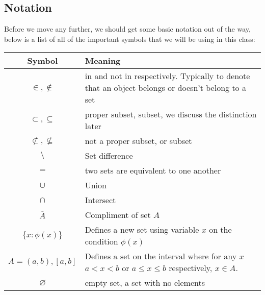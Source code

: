 \subsection{Notation}
Before we move any further, we should get some basic notation out of the way, below is a list of all of the important symbols that we will be using in this class:
\begin{center}
	\begin{longtable}{| c | m{6cm} |}
		\hline 
		Symbol & Meaning \\
		\hline 
		$\in,\notin$   & in and not in respectively. Typically to denote that an object belongs or doesn't belong to a set \\
		\hline 
		$\subset, \subseteq$ & proper subset, subset, we discuss the distinction later \\
		\hline
		$\not\subset, \not\subseteq$ & not a proper subset, or subset \\
		\hline
		$\setminus$ & Set difference \\
		\hline
		$=$ & two sets are equivalent to one another \\
		\hline 
		$\cup$ & Union \\
		\hline
		$\cap$ & Intersect \\
		\hline

		$\overline{A}$ & Compliment of set $A$ \\
		\hline
		$\{x : \phi(x)\}$ & Defines a new set using variable $x$ on the condition $\phi(x)$\\
		\hline
		$A=(a,b),[a,b]$ & Defines a set on the interval where for any $x$ $a < x < b$ or $a\le x \le b$ respectively, $x\in A$. \\
		\hline
		$\varnothing$ & empty set, a set with no elements \\
		\hline
	\end{longtable}
\end{center}

